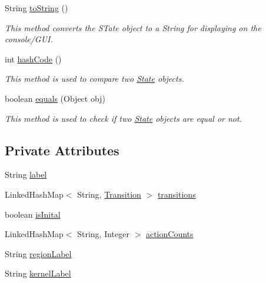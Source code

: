 \begin{DoxyCompactItemize}
String \hyperlink{classmdp_1_1core_1_1_state_a4118e0f9a6d4b0b3cc32a3f0250f7bc9}{to\+String} ()
\begin{DoxyCompactList}\small\item\em This method converts the S\+Tate object to a String for displaying on the console/\+G\+U\+I. \end{DoxyCompactList}\item 
int \hyperlink{classmdp_1_1core_1_1_state_aad74bf43336ba40cc3555f15387219d4}{hash\+Code} ()
\begin{DoxyCompactList}\small\item\em This method is used to compare two \hyperlink{classmdp_1_1core_1_1_state}{State} objects. \end{DoxyCompactList}\item 
boolean \hyperlink{classmdp_1_1core_1_1_state_adfe8841b55dcba54efd73e50f47b3cfc}{equals} (Object obj)
\begin{DoxyCompactList}\small\item\em This method is used to check if two \hyperlink{classmdp_1_1core_1_1_state}{State} objects are equal or not. \end{DoxyCompactList}\end{DoxyCompactItemize}
\subsection*{Private Attributes}
\begin{DoxyCompactItemize}
\item 
String \hyperlink{classmdp_1_1core_1_1_state_a40b54cc46e175c748d5ce129aba70633}{label}
\item 
Linked\+Hash\+Map$<$ String, \hyperlink{classmdp_1_1core_1_1_transition}{Transition} $>$ \hyperlink{classmdp_1_1core_1_1_state_a3c9b563199f7e235fe083b0d16da8cf3}{transitions}
\item 
boolean \hyperlink{classmdp_1_1core_1_1_state_a06eb4d38e11e4be71c5e072fe9f9bee3}{is\+Inital}
\item 
Linked\+Hash\+Map$<$ String, Integer $>$ \hyperlink{classmdp_1_1core_1_1_state_a56e17de2fde7a7f4ee8b1491c11438d5}{action\+Counts}
\item 
String \hyperlink{classmdp_1_1core_1_1_state_aa6f24dca5cb78d028e99f69b9e6ccb2c}{region\+Label}
\item 
String \hyperlink{classmdp_1_1core_1_1_state_ac7ca184df7a0ec4141766692290c18ab}{kernel\+Label}
\end{DoxyCompactItemize}


